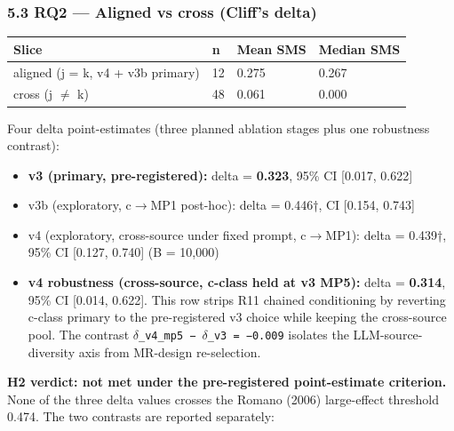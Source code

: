 \documentclass[review,12pt,authoryear]{elsarticle}
\providecommand{\tightlist}{\setlength{\itemsep}{0pt}\setlength{\parskip}{0pt}}
\newcounter{none}                   %
\begin{document}
\subsubsection{5.3 RQ2 --- Aligned vs cross (Cliff's
delta)}\label{rq2-aligned-vs-cross-cliffs-delta}

{\def\LTcaptype{none} %
\begin{longtable}[]{@{}llll@{}}
\toprule\noalign{}
Slice & n & Mean SMS & Median SMS \\
\midrule\noalign{}
\endhead
\bottomrule\noalign{}
\endlastfoot
aligned (j = k, v4 + v3b primary) & 12 & 0.275 & 0.267 \\
cross (j $\neq$ k) & 48 & 0.061 & 0.000 \\
\end{longtable}
}

Four delta point-estimates (three planned ablation stages plus one
robustness contrast):

\begin{itemize}
\tightlist
\item
  \textbf{v3 (primary, pre-registered):} delta = \textbf{0.323}, 95\% CI
  {[}0.017, 0.622{]}
\item
  v3b (exploratory, c$\to$MP1 post-hoc): delta = 0.446†, CI {[}0.154,
  0.743{]}
\item
  v4 (exploratory, cross-source under fixed prompt, c$\to$MP1): delta =
  0.439†, 95\% CI {[}0.127, 0.740{]} (B = 10,000)
\item
  \textbf{v4 robustness (cross-source, c-class held at v3 MP5):} delta =
  \textbf{0.314}, 95\% CI {[}0.014, 0.622{]}. This row strips R11
  chained conditioning by reverting c-class primary to the
  pre-registered v3 choice while keeping the cross-source pool. The
  contrast \texttt{$\delta$\_v4\_mp5\ −\ $\delta$\_v3\ =\ −0.009} isolates the
  LLM-source-diversity axis from MR-design re-selection.
\end{itemize}

\textbf{H2 verdict: not met under the pre-registered point-estimate
criterion.} None of the three delta values crosses the Romano (2006)
large-effect threshold 0.474. The two contrasts are reported separately:
\end{document}
